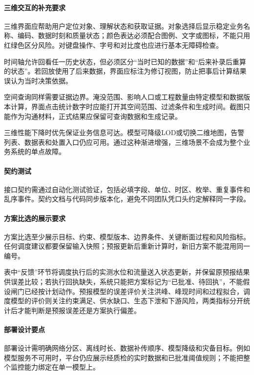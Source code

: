 \paragraph{三维交互的补充要求}
三维界面应帮助用户定位对象、理解状态和获取证据。对象选择后显示稳定业务名称、编码、数据时刻和质量状态；颜色表达必须配合图例、文字或图标，不能只用红绿色区分风险。对键盘操作、字号和对比度也应进行基本无障碍检查。

时间轴允许回看任一历史状态，但必须区分“当时已知的数据”和“后来补录后重算的状态”。若回放使用了后来数据，界面应标注为修订视图，防止把事后计算结果误认为当时决策依据。

空间查询同样需要证据边界。淹没范围、影响人口或工程数量由特定模型和数据版本计算，界面点击统计数字时应能打开其空间范围、过滤条件和生成时间。截图只能作为沟通材料，正式结果应保留可查询数据和生成记录。

三维性能下降时优先保证业务信息可达。模型可降级LOD或切换二维地图，告警列表、数据表和处置入口仍应可用。通过这种渐进增强，三维场景不会成为整个业务系统的单点故障。

\paragraph{契约测试}
接口契约需通过自动化测试验证，包括必填字段、单位、时区、枚举、重复事件和乱序事件。契约文档与代码同步版本化，避免不同团队凭口头约定解释同一字段。

\paragraph{方案比选的展示要求}
方案比选至少展示目标、约束、模型版本、边界条件、关键断面过程和风险指标。任何调度建议都要保留输入快照；预报更新后重新计算时，新旧方案不能混用同一编号。

表中“反馈”环节将调度执行后的实测水位和流量送入状态更新，并保留原预报结果供误差比较；若执行回执缺失，系统只能把方案标记为“已批准、待回执”，不能假设闸门已经按计划动作。预报模型的误差评价关注洪峰、峰现时间和过程拟合，调度模型的评价则关注约束满足、供水缺口、生态下泄和下游风险，两类指标分开统计后才能判断是预报误差还是方案执行偏差。

\paragraph{部署设计要点}
部署设计需明确网络分区、离线时长、数据补传顺序、模型降级和灾备目标。例如模型服务不可用时，平台仍应展示经质检的实时数据和已批准阈值规则；不能把整个监控能力绑定在单一模型上。

